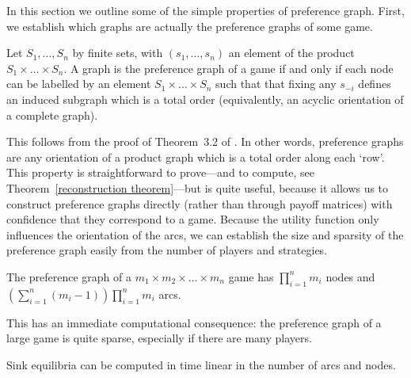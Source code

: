\documentclass[preprint,authoryear]{elsarticle}
\begin{document}
In this section we outline some of the simple properties of preference graph. First, we establish which graphs are actually the preference graphs of some game.
\begin{lem} \label{lem: preference graphs as graphs}
    Let $S_1,\dots,S_n$ by finite sets, with $(s_1,\dots,s_n)$ an element of the product $S_1\times\dots\times S_n$. A graph is the preference graph of a game if and only if each node can be labelled by an element $S_1\times\dots\times S_n$ such that that fixing any $s_{-i}$ defines an induced subgraph which is a total order (equivalently, an acyclic orientation of a complete graph).
\end{lem}
This follows from the proof of Theorem~3.2 of \cite{biggar_graph_2023}. In other words, preference graphs are any orientation of a product graph which is a total order along each `row'. This property is straightforward to prove---and to compute, see Theorem~\ref{reconstruction theorem}---but is quite useful, because it allows us to construct preference graphs directly (rather than through payoff matrices) with confidence that they correspond to a game. Because the utility function only influences the orientation of the arcs, we can establish the size and sparsity of the preference graph easily from the number of players and strategies.

\begin{lem} \label{lem: number of nodes and arcs}
    The preference graph of a $m_1\times m_2 \times \dots \times m_n$ game has $\prod_{i=1}^n m_i$ nodes and $(\sum_{i=1}^n (m_i - 1))\prod_{i=1}^n m_i$ arcs.
\end{lem}

This has an immediate computational consequence: the preference graph of a large game is quite sparse, especially if there are many players. %

\begin{lem} \label{lem computing sink equilibria}
    Sink equilibria can be computed in time linear in the number of arcs and nodes.
\end{lem}
\end{document}

